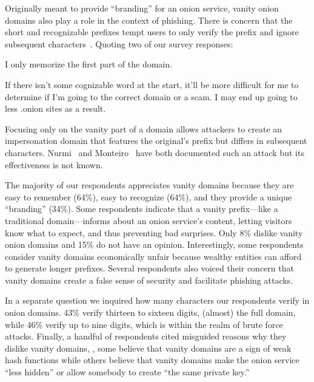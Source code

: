 Originally meant to provide ``branding'' for an onion service, vanity onion
domains also play a role in the context of phishing.  There is concern that the
short and recognizable prefixes tempt users to only verify the prefix and ignore
subsequent characters~\cite{Winter2015a}.  Quoting two of our survey responses:

\begin{displayquote}
I only memorize the first part of the domain.
\end{displayquote}

\begin{displayquote}
If there isn't some cognizable word at the start, it'll be more difficult for me
to determine if I'm going to the correct domain or a scam. I may end up going to
less .onion sites as a result.
\end{displayquote}

Focusing only on the vanity part of a domain allows attackers to create an
impersonation domain that features the original's prefix but differs in
subsequent characters.  Nurmi~\cite{Nurmi2015a} and
Monteiro~\cite{Monteiro2016a} have both documented such an attack but its
effectiveness is not known.

The majority of our respondents appreciates vanity domains because they are easy
to remember (64\%), easy to recognize (64\%), and they provide a unique
``branding'' (34\%).  Some respondents indicate that a vanity prefix---like a
traditional domain---informs about an onion service's content, letting visitors
know what to expect, and thus preventing bad surprises.  Only 8\% dislike vanity
onion domains and 15\% do not have an opinion.  Interestingly, some respondents
consider vanity domains economically unfair because wealthy entities can afford
to generate longer prefixes.  Several respondents also voiced their concern that
vanity domains create a false sense of security and facilitate phishing attacks.

In a separate question we inquired how many characters our respondents verify in
onion domains.  43\% verify thirteen to sixteen digits, \ie (almost) the full
domain, while 46\% verify up to nine digits, which is within the realm of brute
force attacks.  Finally, a handful of respondents cited misguided reasons why
they dislike vanity domains, \eg, some believe that vanity domains are a sign of
weak hash functions while others believe that vanity domains make the onion
service ``less hidden'' or allow somebody to create ``the same private key.''
